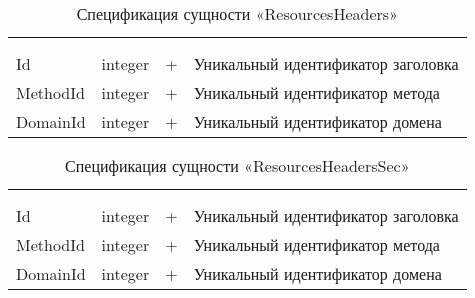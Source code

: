 \begin{xltabular}{\textwidth}{|X|X|X|X|}
	\caption{Спецификация сущности «ResourcesHeaders»}\label{indexer_resources_headers:table}\\ \hline
	 &  &  &  \\ \hline
	 &  &  &  \\ \hline
	\endfirsthead
	 \hline
	 &  &  &  \\ \hline
	\endhead
	Id & integer & + & Уникальный идентификатор заголовка \\ \hline
	MethodId & integer & + & Уникальный идентификатор метода \\ \hline
	DomainId & integer & + & Уникальный идентификатор домена \\ \hline
\end{xltabular}

\begin{xltabular}{\textwidth}{|X|X|X|X|}
	\caption{Спецификация сущности «ResourcesHeadersSec»}\label{indexer_resources_headers_sec:table}\\ \hline
	 &  &  &  \\ \hline
	 &  &  &  \\ \hline
	\endfirsthead
	 \hline
	 &  &  &  \\ \hline
	\endhead
	Id & integer & + & Уникальный идентификатор заголовка \\ \hline
	MethodId & integer & + & Уникальный идентификатор метода \\ \hline
	DomainId & integer & + & Уникальный идентификатор домена \\ \hline
\end{xltabular}


